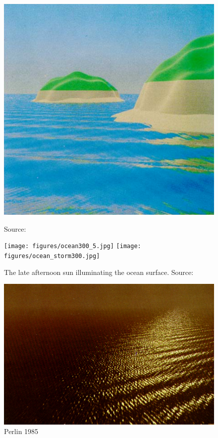 \begin{figure}
{ }
 \hfill
 \subtop
 {
  \includegraphics[scale=0.25]{figures/Vectorized_Procedural_Models_for_Natural_Terrain_-_Max_1981-007_2.png}
 }
\caption{Source:~\cite{Max:1981}}
\label{fig:max1981}
\end{figure}

\begin{figure}
\centering
 \subtop
 {
  \texttt{[image: figures/ocean300\_5.jpg]}
 }
 \hfill
 \subtop
 {
  \texttt{[image: figures/ocean\_storm300.jpg]}
 }
\caption{The late afternoon sun illuminating the ocean surface. Source:~\cite{misc:noaa}}
\end{figure}

\begin{figure}
 \centering
 \includegraphics[scale=0.25]{figures/An_Image_Synthesizer_-_Perlin_1985-021.png}
 \caption{Perlin 1985}
\end{figure}

